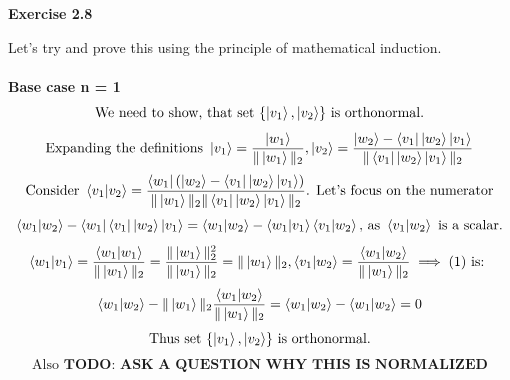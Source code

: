 \documentclass{article}
\begin{document}
\begin{framed}
    \noindent \textbf{Exercise 2.8}
    
    \medskip
    Let's try and prove this using the principle of mathematical induction. \\ \\ 
    \textbf{Base case n = 1}
    \begin{equation*}
        \text{We need to show, that set } \{\ket{v_1} , \ket{v_2}\} \text{ is orthonormal.}
    \end{equation*}
    \begin{equation*}
    \text{Expanding the definitions }
        \ket{v_1} = \frac{\ket{w_1}}{\|\ket{w_1}\|_2}, \ket{v_2} = \frac{\ket{w_2} - \bra{v_1}\ket{w_{2}}\ket{v_1}}{\|\bra{v_1}\ket{w_{2}}\ket{v_1}\|_2}
    \end{equation*}
    \begin{equation*}
        \text{Consider } \braket{v_1 | v_2} = \frac{\bra{w_1} (\ket{w_2} - \bra{v_1}\ket{w_{2}}\ket{v_1})}{\|\ket{w_1}\|_2\|\bra{v_1}\ket{w_{2}}\ket{v_1}\|_2}
        \text{. Let's focus on the numerator}
    \end{equation*}
    \begin{equation}
        \braket{w_1 | w_2} - \bra{w_1}\bra{v_1}\ket{w_2}\ket{v_1} = \braket{w_1 | w_2} - \braket{w_1 | v_1}\braket{v_1 | w_2} \text{, as } \braket{v_1 | w_2} \text{ is a scalar.}
    \end{equation}
    \begin{equation*}
        \braket{w_1 | v_1} = \frac{\braket{w_1 | w_1}}{\|\ket{w_1}\|_2} = \frac{\|\ket{w_1}\|_2^{2}}{\|\ket{w_1}\|_2} = \|\ket{w_1}\|_2 , \braket{v_1 | w_2} = \frac{\braket{w_1 | w_2}}{\|\ket{w_1}\|_2}
        \implies (1) \text{ is: }
    \end{equation*}
    \begin{equation*}
        \braket{w_1 | w_2} - \|\ket{w_1}\|_2\frac{\braket{w_1 | w_2}}{\|\ket{w_1}\|_2} = \braket{w_1 | w_2} - \braket{w_1 | w_2} = 0
    \end{equation*}
    \begin{equation*}
        \text{Thus set } \{\ket{v_1} , \ket{v_2}\} \text{ is orthonormal.}
    \end{equation*}
    \begin{equation*}
        \text{Also } \textbf{TODO: ASK A QUESTION WHY THIS IS NORMALIZED}
    \end{equation*}


\end{framed}
\end{document}
